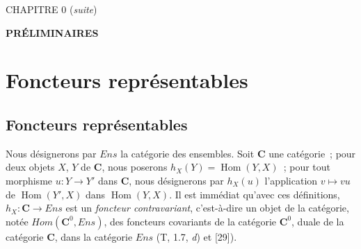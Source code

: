 \clearpage
\thispagestyle{plain}
\label{chapter:0III-fr}

\begin{center}
{\large CHAPITRE 0 (\textit{suite})\footnotemark\par}
\vspace{1.5em}
{\Large\bfseries PRÉLIMINAIRES\par}
\end{center}


\setcounter{section}{7}
\section{Foncteurs représentables}
\label{section:0.8-fr}

\setcounter{subsection}{0}
\subsection{Foncteurs représentables}
\label{subsection:0.8.1-fr}

\begin{env}[8.1.1]
\label{0.8.1.1-fr}
Nous désignerons par $\boldsymbol{\mathit{Ens}}$ la catégorie des ensembles. Soit $\boldsymbol{C}$ une
catégorie~; pour deux objets $X$, $Y$ de $\boldsymbol{C}$, nous poserons
$h_X(Y)=\operatorname{Hom}(Y,X)$~; pour tout morphisme $u:Y\to Y'$ dans $\boldsymbol{C}$,
nous désignerons par $h_X(u)$ l'application $v\mapsto vu$ de
$\operatorname{Hom}(Y',X)$ dans $\operatorname{Hom}(Y,X)$. Il est immédiat
qu'avec ces définitions, $h_X:\boldsymbol{C}\to\boldsymbol{\mathit{Ens}}$ est un \emph{foncteur
contravariant}, c'est-à-dire un objet de la catégorie, notée
$\boldsymbol{\mathit{Hom}}(\boldsymbol{C}^0,\boldsymbol{\mathit{Ens}})$, des foncteurs covariants de la
catégorie $\boldsymbol{C}^0$, duale de la catégorie $\boldsymbol{C}$, dans la catégorie
$\boldsymbol{\mathit{Ens}}$ (T, 1.7, \textit{d}) et [29]).
\end{env}

